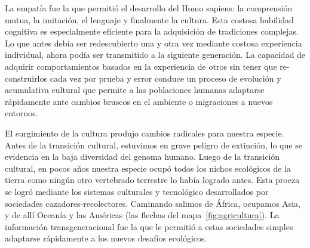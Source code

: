 \documentclass[a4paper,10pt]{book}
\begin{document}

La empatía fue la que permitió el desarrollo del Homo sapiens: la comprensión mutua, la imitación, el lenguaje y finalmente la cultura.
Esta costosa habilidad cognitiva es especialmente eficiente para la adquisición de tradiciones complejas.
Lo que antes debía ser redescubierto una y otra vez mediante costosa experiencia individual, ahora podía ser transmitido a la siguiente generación.
La capacidad de adquirir comportamientos basados en la experiencia de otros sin tener que re-construirlos cada vez por prueba y error conduce un proceso de evolución y acumulativa cultural que permite a las poblaciones humanas adaptarse rápidamente ante cambios bruscos en el ambiente o migraciones a nuevos entornos.


El surgimiento de la cultura produjo cambios radicales para nuestra especie.
Antes de la transición cultural, estuvimos en grave peligro de extinción, lo que se evidencia en la baja diversidad del genoma humano.
Luego de la transición cultural, en pocos años nuestra especie ocupó todos los nichos ecológicos de la tierra como ningún otro vertebrado terrestre lo había logrado antes.
Esta proeza se logró mediante los sistemas culturales y tecnológico desarrollados por sociedades cazadores-recolectores.
Caminando salimos de África, ocupamos Asia, y de allí Oceanía y las Américas (las flechas del mapa~\ref{fig:agricultura}).
La información transgeneracional fue la que le permitió a estas sociedades simples adaptarse rápidamente a los nuevos desafíos ecológicos.

\end{document}
